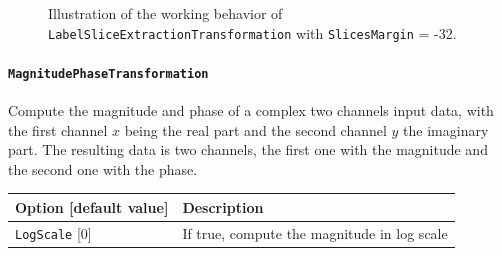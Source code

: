 \documentclass[a4paper,11pt,oneside]{article}
\begin{document}
\begin{figure}[!htb]
  \centering
  \qquad
  \caption{Illustration of the working behavior of \lstinline[basicstyle=\ttfamily\bfseries]!LabelSliceExtractionTransformation! with \lstinline!SlicesMargin! = -32.}
  \label{fig:LabelSliceExtractionTransformation1}
\end{figure}



\paragraph{\texorpdfstring{%
\lstinline[basicstyle=\ttfamily\bfseries]!MagnitudePhaseTransformation!}
{MagnitudePhaseTransformation}}
Compute the magnitude and phase of a complex two channels input data, with the
first channel $x$ being the real part and the second channel $y$ the imaginary
part. The resulting data is two channels, the first one with the magnitude and
 the second one with the phase.

\begin{center}
 \begin{tabular}{| p{5cm} | p{10cm} | }
 \hline
 Option [default value] & Description\\
 \hline\hline
  \lstinline!LogScale! [0] & If true, compute the magnitude in log scale \\
 \hline
\end{tabular}
\end{center}
\end{document}
